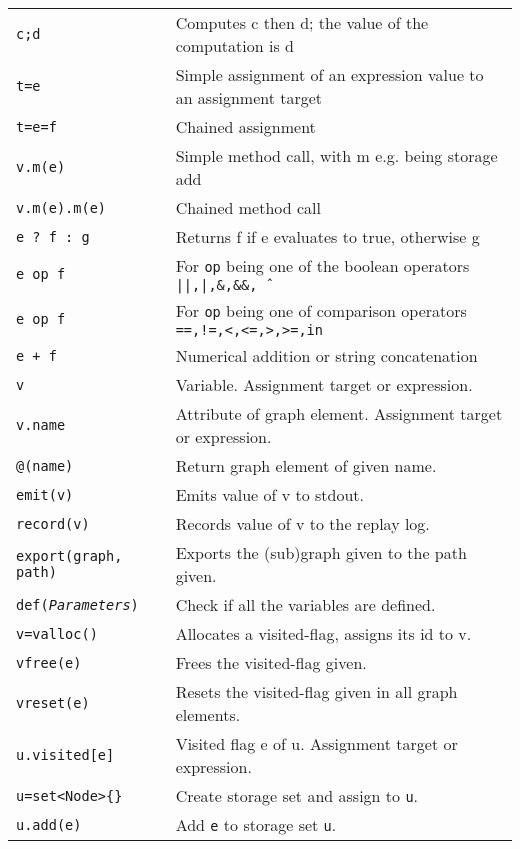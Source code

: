 \begin{table}[htbp]
\begin{minipage}{\linewidth} \renewcommand{\footnoterule}{} 
\begin{tabularx}{\linewidth}{|lX|}
\hline
\texttt{c;d}	& Computes c then d; the value of the computation is d\\
\texttt{t=e}	& Simple assignment of an expression value to an assignment target\\
\texttt{t=e=f}	& Chained assignment \\
\texttt{v.m(e)}	& Simple method call, with m e.g. being storage add \\
\texttt{v.m(e).m(e)}	& Chained method call\\
\hline
\texttt{e ? f : g}	& Returns f if e evaluates to true, otherwise g \\
\texttt{e op f}	& For \texttt{op} being one of the boolean operators \texttt{||,|,\&,\&\&,\^\ } \\
\texttt{e op f}	& For \texttt{op} being one of comparison operators \texttt{==,!=,<,<=,>,>=,in} \\
\texttt{e + f}	& Numerical addition or string concatenation \\
\hline
\texttt{v} & Variable. Assignment target or expression.\\
\texttt{v.name} & Attribute of graph element. Assignment target or expression.\\
\texttt{@(name)} & Return graph element of given name.\\
\texttt{emit(v)} & Emits value of v to stdout.\\
\texttt{record(v)} & Records value of v to the replay log.\\
\texttt{export(graph, path)} & Exports the (sub)graph given to the path given.\\
\texttt{def(\emph{Parameters})} & Check if all the variables are defined.\\
\hline
\texttt{v=valloc()} & Allocates a visited-flag, assigns its id to v.\\
\texttt{vfree(e)} & Frees the visited-flag given.\\
\texttt{vreset(e)} & Resets the visited-flag given in all graph elements.\\
\texttt{u.visited[e]} & Visited flag e of u. Assignment target or expression.\\
\hline
\texttt{u=set<Node>\{\}}	& Create storage set and assign to \texttt{u}.\\
\texttt{u.add(e)}	& Add \texttt{e} to storage set \texttt{u}.\\

\end{tabularx}
\end{minipage}
\end{table}
